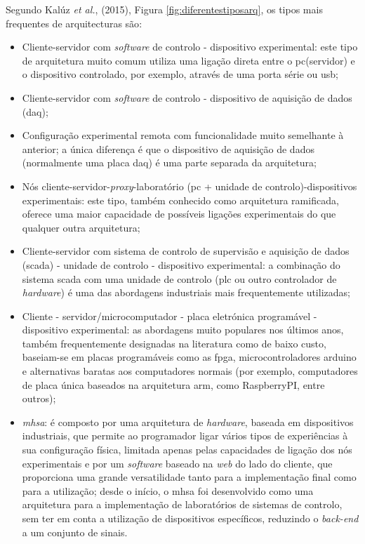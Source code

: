 Segundo Kalúz \textit{et al.}, (2015), Figura \ref{fig:diferentestiposarq}, os tipos mais frequentes de arquitecturas são\cite{Kaluz}:
\begin{itemize}
    \item Cliente-servidor com \textit{software} de controlo - dispositivo experimental: este tipo de arquitetura muito comum utiliza uma ligação direta entre o \acrshort{pc}(servidor) e o dispositivo controlado, por exemplo, através de uma porta série ou \acrfull{usb};
    \item Cliente-servidor com \textit{software} de controlo - dispositivo de aquisição de dados (\acrfull{daq});
    \item Configuração experimental remota com funcionalidade muito semelhante à anterior; a única diferença é que o dispositivo de aquisição de dados (normalmente uma placa \acrshort{daq}) é uma parte separada da arquitetura;
    \item Nós cliente-servidor-\textit{proxy}-laboratório (\acrshort{pc} + unidade de controlo)-dispositivos experimentais: este tipo, também conhecido como arquitetura ramificada, oferece uma maior capacidade de possíveis ligações experimentais do que qualquer outra arquitetura;
    \item Cliente-servidor com sistema de controlo de supervisão e aquisição de dados (\acrfull{scada}) - unidade de controlo - dispositivo experimental: a combinação do sistema \acrshort{scada} com uma unidade de controlo (\acrfull{plc} ou outro controlador de \textit{hardware}) é uma das abordagens industriais mais frequentemente utilizadas;
    \item Cliente - servidor/microcomputador - placa eletrónica programável - dispositivo experimental: as abordagens muito populares nos últimos anos, também frequentemente designadas na literatura como de baixo custo, baseiam-se em placas programáveis como as \acrshort{fpga}, microcontroladores \gls{arduino} e alternativas baratas aos computadores normais (por exemplo, computadores de placa única baseados na arquitetura \acrfull{arm}, como \gls{RaspberryPI}, entre outros);
    \item \textit{\acrfull{mhsa}}: é composto por uma arquitetura de \textit{hardware}, baseada em dispositivos industriais, que permite ao programador ligar vários tipos de experiências à sua configuração física, limitada apenas pelas capacidades de ligação dos nós experimentais e por um \textit{software} baseado na \textit{web} do lado do cliente, que proporciona uma grande versatilidade tanto para a implementação final como para a utilização; desde o início, o \acrshort{mhsa} foi desenvolvido como uma arquitetura para a implementação de laboratórios de sistemas de controlo, sem ter em conta a utilização de dispositivos específicos, reduzindo o \textit{back-end} a um conjunto de sinais.
\end{itemize}

